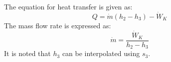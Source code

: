 The equation for heat transfer is given as:  
\[
Q = \dot{m} (h_2 - h_3) - \dot{W}_K
\]  
The mass flow rate is expressed as:  
\[
\dot{m} = \frac{\dot{W}_K}{h_2 - h_3}
\]  
It is noted that \( h_3 \) can be interpolated using \( s_3 \).